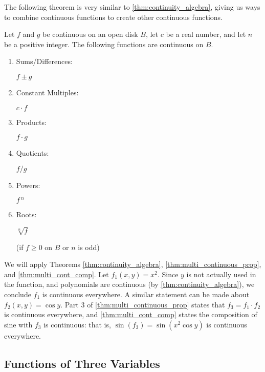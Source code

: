 The following theorem is very similar to \autoref{thm:continuity_algebra}, giving us ways to combine continuous functions to create other continuous functions.

{Let $f$ and $g$ be continuous on an open disk $B$, let $c$ be a real number, and let $n$ be a positive integer. The following functions are continuous on $B$.%
%
\begin{enumerate}
	\item		\parbox{80pt}{Sums/Differences:}	$f\pm g$
	\item		\parbox{80pt}{Constant Multiples:}	$c\cdot f$
	\item		\parbox{80pt}{Products:}	$f\cdot g$
	\item		\parbox{80pt}{Quotients:}	$f/g$ 
	\item		\parbox{80pt}{Powers:}	$f\,^n$
	\item		\parbox{80pt}{Roots:}	$\sqrt[n]{f}$ \qquad \parbox[t]{150pt}{\small (if $f\geq 0$ on $B$ or $n$ is odd)}
\end{enumerate}}



{We will apply Theorems \ref{thm:continuity_algebra}, \ref{thm:multi_continuous_prop}, and \ref{thm:multi_cont_comp}. Let $f_1(x,y) = x^2$. Since $y$ is not actually used in the function, and polynomials are continuous (by \autoref{thm:continuity_algebra}), we conclude $f_1$ is continuous everywhere. A similar statement can be made about $f_2(x,y) = \cos y$. Part 3 of \autoref{thm:multi_continuous_prop} states that $f_3=f_1\cdot f_2$ is continuous everywhere, and \autoref{thm:multi_cont_comp} states the composition of sine with $f_3$ is continuous: that is, $\sin (f_3) = \sin(x^2\cos y)$ is continuous everywhere.}

\subsection*{Functions of Three Variables}

